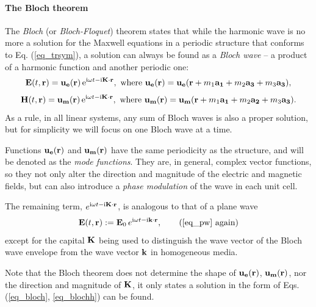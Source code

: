 \paragraph{The Bloch theorem}%
The \textit{Bloch} (or \textit{Bloch-Floquet}) theorem states that while the harmonic wave is no more a solution for the Maxwell equations in a periodic structure that conforms to Eq. (\ref{eq_trsym}), a solution can always be found as a \textit{Bloch wave} -- a product of a harmonic function and another periodic one:
\begin{equation} 
\mathbf{E}(t, {\mathbf{r}}) = \mathbf{u_e}({\mathbf{r}})\,\mathrm{e}^{{\mathrm i}\omega t - {\mathrm i}{\mathbf{K}}\cdot{\mathbf{r}}}, \text{ where } \mathbf{u_e}({\mathbf{r}}) = \mathbf{u_e}({\mathbf{r}} + m_1 {\mathbf{a_1}} + m_2 {\mathbf{a_3}} + m_3 {\mathbf{a_3}}),
\label{eq_bloch}\end{equation} 
\begin{equation}
\mathbf{H}(t, {\mathbf{r}}) = \mathbf{u_m}({\mathbf{r}})\,\mathrm{e}^{{\mathrm i}\omega t - {\mathrm i}{\mathbf{K}}\cdot{\mathbf{r}}}, \text{ where } \mathbf{u_m}({\mathbf{r}}) = \mathbf{u_m}({\mathbf{r}} + m_1 {\mathbf{a_1}} + m_2 {\mathbf{a_2}} + m_3 {\mathbf{a_3}}).
\label{eq_blochh}\end{equation} 
As a rule, in all linear systems, any sum of Bloch waves is also a proper solution, but for simplicity we will focus on one Bloch wave at a time.

Functions $\mathbf{u_e}({\mathbf{r}})$ and $\mathbf{u_m}({\mathbf{r}})$ have the same periodicity as the structure, and will be denoted as the \textit{mode functions}. They are, in general, complex vector functions, so they not only alter the direction and magnitude of the electric and magnetic fields, but can also introduce a \textit{phase modulation} of the wave in each unit cell. 

The remaining term, $e^{{\mathrm i}\omega t - {\mathrm i}{\mathbf{K}}\cdot{\mathbf{r}}}$, is analogous to that of a plane wave
\begin{equation} \E(t, \rr) := \E_0\, e^{\ii\omega t - \ii\kk\cdot\rr}, \tag{\ref{eq_pw} \again} \end{equation}
except for the capital ${\mathbf{K}}$ being used to distinguish the wave vector of the Bloch wave envelope from the wave vector ${\mathbf{k}}$ in homogeneous media. 

Note that the Bloch theorem does not determine the shape of $\mathbf{u_e}({\mathbf{r}})$, $\mathbf{u_m}({\mathbf{r}})$, nor the direction and magnitude of ${\mathbf{K}}$, it only states a solution in the form of Eqs. (\ref{eq_bloch}, \ref{eq_blochh}) can be found.

